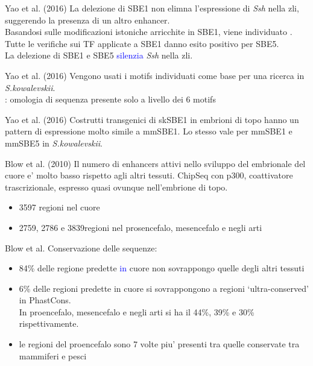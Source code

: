 \documentclass{beamer}
\newcommand{\warn}[1]{\textcolor{blue}{#1}}
\begin{document}
    \begin{frame}{Yao et al. (2016)}
        La delezione di SBE1 non elimna l'espressione di \emph{Ssh} nella zli,
        suggerendo la presenza di un altro enhancer.\\
        Basandosi sulle modificazioni istoniche arricchite in SBE1, viene individuato .\\
        Tutte le verifiche sui TF applicate a SBE1 danno esito positivo per SBE5.\\
        La delezione di SBE1 e SBE5 \warn{silenzia} \emph{Ssh} nella zli.
    \end{frame}

    \begin{frame}{Yao et al. (2016)}
        Vengono usati i motifs individuati come base per una ricerca in \emph{S.kowalevskii}.\\
        : omologia di sequenza presente solo a livello dei 6 motifs
    \end{frame}

    \begin{frame}{Yao et al. (2016)}
        Costrutti transgenici di skSBE1 in embrioni di topo hanno un pattern di espressione
        molto simile a mmSBE1. Lo stesso vale per mmSBE1 e mmSBE5 in \emph{S.kowalevskii}.
    \end{frame}

    \begin{frame}{Blow et al. (2010)}
        Il numero di enhancers attivi nello sviluppo del embrionale del cuore
        e' molto basso rispetto agli altri tessuti.
        ChipSeq con p300, coattivatore trascrizionale, espresso quasi
        ovunque nell'embrione di topo.
        \begin{itemize}
            \item 3597 regioni nel cuore
            \item 2759, 2786 e 3839regioni nel prosencefalo,
            mesencefalo e negli arti
        \end{itemize}
    \end{frame}

    \begin{frame}{Blow et al.}
        Conservazione delle sequenze:
        \begin{itemize}
            \item 84\% delle regione predette \warn{in} cuore non sovrappongo quelle degli altri tessuti
            \item 6\% delle regioni predette in cuore si sovrappongono a regioni `ultra-conserved'
            in PhastCons.\\
            In proencefalo, mesencefalo e negli arti si ha il 44\%, 39\% e 30\% rispettivamente.
            \item le regioni del proencefalo sono 7 volte piu' presenti tra quelle conservate
            tra mammiferi e pesci
        \end{itemize}
    \end{frame}
\end{document}
